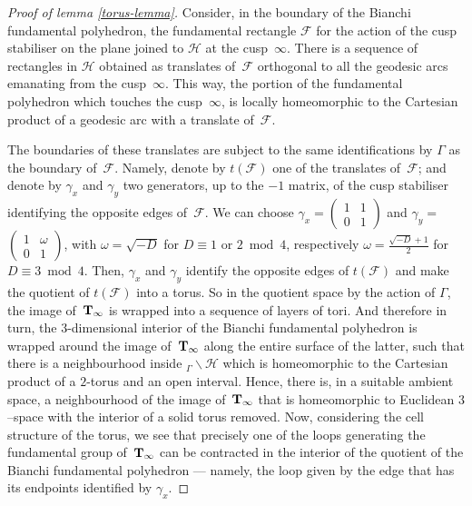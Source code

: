 \documentclass[twoside,a4paper,12 pt]{amsart}
\newcommand{\Hy}{\mathcal{H}}
\newcommand{\T}{{\bf{T}}}
\theoremstyle{plain}
\theoremstyle{definition}
\theoremstyle{remark}
\begin{document}
\begin{proof}[Proof of lemma \ref{torus-lemma}]
 Consider, in the boundary of the Bianchi fundamental polyhedron, the fundamental rectangle $\mathcal F$ for the action of the cusp stabiliser on the plane joined to $\Hy$ at the cusp~$\infty$.
 There is a sequence of rectangles in $\Hy$ obtained as translates of~$\mathcal F$ orthogonal to all the geodesic arcs emanating from the cusp~$\infty$.
 This way, the portion of the fundamental polyhedron which touches the cusp~$\infty$, is locally homeomorphic to the Cartesian product of a geodesic arc with a translate of~$\mathcal F$.

 The boundaries of these translates are subject to the same identifications by $\Gamma$ as the boundary of~$\mathcal F$.
 Namely, denote by $t({\mathcal F})$ one of the translates of~$\mathcal F$; and denote by 
 $\gamma_x$ and $\gamma_y$ two generators, up to the $-1$ matrix, of the cusp stabiliser identifying the opposite edges of~$\mathcal F$.
We can choose $\gamma_x =$\scriptsize$\begin{pmatrix} 1 & 1 \\ 0 & 1 \end{pmatrix}$ \normalsize 
and $\gamma_y =$\scriptsize$\begin{pmatrix} 1 & \omega \\ 0 & 1 \end{pmatrix}$, \normalsize
with $\omega = \sqrt{-D}$ for $D \equiv 1\text{ or }2 \bmod 4$, respectively $\omega = \frac{\sqrt{-D}+1}{2}$ for $D \equiv 3 \bmod 4$.
Then,  $\gamma_x$ and $\gamma_y$ identify the opposite edges of $t({\mathcal F})$
 and make the quotient of $t({\mathcal F})$ into a torus.
  So in the quotient space by the action of  $\Gamma$, the image of~$\T_\infty$ is wrapped into a sequence of layers of tori.
 And therefore in turn, the 3-dimensional interior of the  Bianchi fundamental polyhedron is wrapped around the image of~$\T_\infty$
 along the entire surface of the latter, such that there is a neighbourhood inside $_\Gamma \backslash \Hy$ which is homeomorphic to the Cartesian product of a $2$-torus and an open interval.
 Hence, there is, in a suitable ambient space, a neighbourhood of the image of~$\T_\infty$ that is homeomorphic to Euclidean $3$--space with the interior of a solid torus removed.
 Now, considering the cell structure of the torus, we see that precisely one of the loops generating the fundamental group of~$\T_\infty$
 can be contracted in the interior of the quotient of the Bianchi fundamental polyhedron --- namely, the loop given by the edge that has its endpoints identified by $\gamma_x$.

\end{proof}
\end{document}
